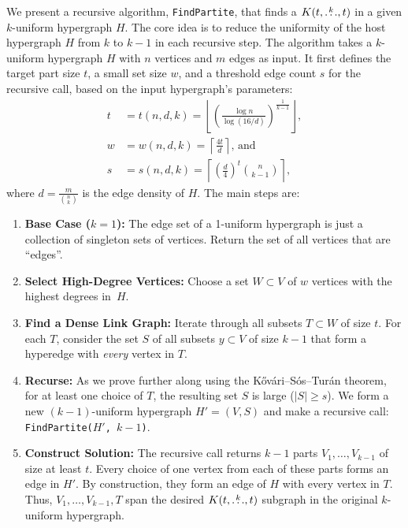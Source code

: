 We present a recursive algorithm, \texttt{FindPartite}, that finds a $K(t, \overset{k}{\dots}, t)$ in a given $k$-uniform hypergraph $H$.
The core idea is to reduce the uniformity of the host hypergraph $H$ from $k$ to $k-1$ in each recursive step.
The algorithm takes a $k$-uniform hypergraph $H$ with $n$ vertices and $m$ edges as input.
It first defines the target part size $t$, a small set size $w$,
and a threshold edge count $s$ for the recursive call, based on the input hypergraph's parameters:
\begin{align*}
    t &= t(n, d, k) = \left\lfloor \left( \frac{\log n}{\log (16/d)}\right)^{\frac{1}{k-1}}\right\rfloor, \\
    w &= w(n, d, k) = \left\lceil \frac{4 t}{d}\right\rceil \text{, and } \\
    s &= s(n, d, k) = \left\lceil \left( \frac{d}{4}\right)^t \binom{n}{k-1}\right\rceil,
\end{align*}
where $d = \frac{m}{\binom{n}{k}}$ is the edge density of $H$.
The main steps are:
\begin{enumerate}
    \item \textbf{Base Case ($k=1$):} The edge set of a 1-uniform hypergraph is just a collection of singleton sets of vertices.
    Return the set of all vertices that are ``edges''.

    \item \textbf{Select High-Degree Vertices:} Choose a set $W \subset V$ of $w$ vertices with the highest degrees in~$H$. \label{W}

    \item \textbf{Find a Dense Link Graph:} Iterate through all subsets $T \subset W$ of size $t$.
    For each $T$, consider the set $S$ of all subsets $y \subset V$ of size $k-1$ that form a hyperedge with \emph{every} vertex in $T$. \label{link}

    \item \textbf{Recurse:} As we prove further along using the K\H{o}v\'{a}ri–S\'{o}s–Tur\'{a}n theorem, for at least one choice of $T$,
    the resulting set $S$ is large ($|S| \ge s$). We form a new $(k-1)$-uniform hypergraph $H'=(V, S)$ and make a recursive call: \texttt{FindPartite($H'$, $k-1$)}.

    \item \textbf{Construct Solution:} The recursive call returns $k-1$ parts $V_1, \dots, V_{k-1}$ of size at least $t$.
    Every choice of one vertex from each of these parts forms an edge in $H'$.
    By construction, they form an edge of $H$ with every vertex in $T$.
    Thus, $V_1, \dots, V_{k-1}, T$ span the desired $K(t, \overset{k}{\dots}, t)$ subgraph in the original $k$-uniform hypergraph.

\end{enumerate}

